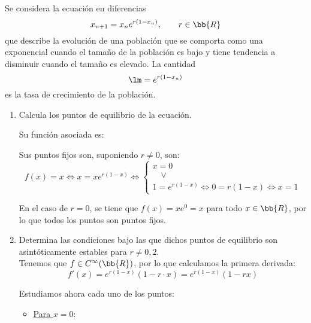 \begin{ejercicio}
    Se considera la ecuación en diferencias
    \begin{equation*}
        x_{n+1} = x_ne^{r(1-x_n)},\qquad r\in \bb{R}
    \end{equation*}
    que describe la evolución de una población que se comporta como una exponencial cuando el tamaño de la población es bajo y tiene tendencia a disminuir cuando el tamaño es elevado. La cantidad
    \begin{equation*}
        \lm = e^{r(1-x_n)}
    \end{equation*}
    es la tasa de crecimiento de la población.
    \begin{enumerate}
        \item Calcula los puntos de equilibrio de la ecuación.

        Su función asociada es:

        Sus puntos fijos son, suponiendo $r\neq 0$, son:
        \begin{equation*}
            f(x)=x \Longleftrightarrow x=xe^{r(1-x)} \Longleftrightarrow
            \left\{\begin{array}{l}
                x= 0 \\
                \quad \lor\\
                1 = e^{r(1-x)} \Longleftrightarrow 0 = r(1-x) \Longleftrightarrow x=1
            \end{array}\right.
        \end{equation*}

        En el caso de $r=0$, se tiene que $f(x)=xe^0=x$ para todo $x\in \bb{R}$, por lo que todos los puntos son puntos fijos.
        
        \item Determina las condiciones bajo las que dichos puntos de equilibrio son asintóticamente estables para $r \neq 0, 2$.\\

        Tenemos que $f\in C^\infty(\bb{R})$, por lo que calculamos la primera derivada:
        \begin{equation*}
            f'(x)=e^{r(1-x)}(1-r\cdot x) =e^{r(1-x)}(1-rx)
        \end{equation*}

        Estudiamos ahora cada uno de los puntos:
        \begin{itemize}
            \item \ul{Para $x=0$}:


\end{itemize}
\end{enumerate}
\end{ejercicio}
